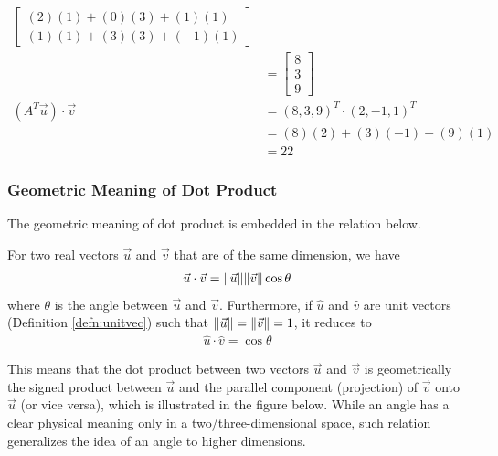 \begin{solution}
\begin{align*}
\begin{bmatrix}
(2)(1) + (0)(3) + (1)(1) \\
(1)(1) + (3)(3) + (-1)(1) 
\end{bmatrix} \\
&=
\begin{bmatrix}
8 \\
3 \\
9
\end{bmatrix} \\
(A^T\vec{u}) \cdot \vec{v} &= (8,3,9)^T \cdot (2,-1,1)^T \\
&= (8)(2) + (3)(-1) + (9)(1) \\
&= 22
\end{align*}
\end{solution}

\subsubsection{Geometric Meaning of Dot Product}
The geometric meaning of dot product is embedded in the relation below.
\begin{proper}
\label{proper:dotgeo}
For two real vectors $\vec{u}$ and $\vec{v}$ that are of the same dimension, we have
\begin{align*}
\vec{u} \cdot \vec{v} = \norm{\vec{u}}\norm{\vec{v}}\cos\theta
\end{align*}
where $\theta$ is the angle between $\vec{u}$ and $\vec{v}$. Furthermore, if $\hat{u}$ and $\hat{v}$ are unit vectors (Definition \ref{defn:unitvec}) such that $\norm{\vec{u}} = \norm{\vec{v}} = 1$, it reduces to
\begin{align*}
\hat{u} \cdot \hat{v} = \cos\theta    
\end{align*}
\end{proper}
This means that the dot product between two vectors $\vec{u}$ and $\vec{v}$ is geometrically the signed product between $\vec{u}$ and the parallel component (projection) of $\vec{v}$ onto $\vec{u}$ (or vice versa), which is illustrated in the figure below. While an angle has a clear physical meaning only in a two/three-dimensional space, such relation generalizes the idea of an angle to higher dimensions.
\begin{center}
\end{center}
